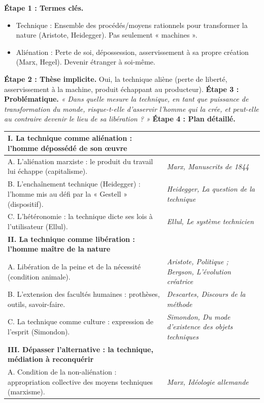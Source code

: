 \documentclass[11pt]{article}
\newcommand{\cle}[1]{{\popxbold\color{popdark}#1}}
\begin{document}
\begin{exoresolu}
\textbf{Étape 1 : Termes clés.}
\begin{itemize}
    \item \cle{Technique} : Ensemble des procédés/moyens rationnels pour transformer la nature (Aristote, Heidegger). Pas seulement « machines ».
    \item \cle{Aliénation} : Perte de soi, dépossession, asservissement à sa propre création (Marx, Hegel). Devenir étranger à soi-même.
\end{itemize}
\textbf{Étape 2 : Thèse implicite.} Oui, la technique aliène (perte de liberté, asservissement à la machine, produit échappant au producteur).
\textbf{Étape 3 : Problématique.} \emph{« Dans quelle mesure la technique, en tant que puissance de transformation du monde, risque-t-elle d'asservir l'homme qui la crée, et peut-elle au contraire devenir le lieu de sa libération ? »}
\textbf{Étape 4 : Plan détaillé.}
\begin{center}
\begin{tabularx}{\linewidth}{|l|X|}\hline
\textbf{I. La technique comme aliénation : l'homme dépossédé de son œuvre} & \\ \hline
A. L'aliénation marxiste : le produit du travail lui échappe (capitalisme). & \textit{Marx, Manuscrits de 1844} \\ \hline
B. L'enchaînement technique (Heidegger) : l'homme mis au défi par la « Gestell » (dispositif). & \textit{Heidegger, La question de la technique} \\ \hline
C. L'hétéronomie : la technique dicte ses lois à l'utilisateur (Ellul). & \textit{Ellul, Le système technicien} \\ \hline
\textbf{II. La technique comme libération : l'homme maître de la nature} & \\ \hline
A. Libération de la peine et de la nécessité (condition animale). & \textit{Aristote, Politique ; Bergson, L'évolution créatrice} \\ \hline
B. L'extension des facultés humaines : prothèses, outils, savoir-faire. & \textit{Descartes, Discours de la méthode} \\ \hline
C. La technique comme culture : expression de l'esprit (Simondon). & \textit{Simondon, Du mode d'existence des objets techniques} \\ \hline
\textbf{III. Dépasser l'alternative : la technique, médiation à reconquérir} & \\ \hline
A. Condition de la non-aliénation : appropriation collective des moyens techniques (marxisme). & \textit{Marx, Idéologie allemande} \\ \hline

\end{tabularx}
\end{center}
\end{exoresolu}
\end{document}
